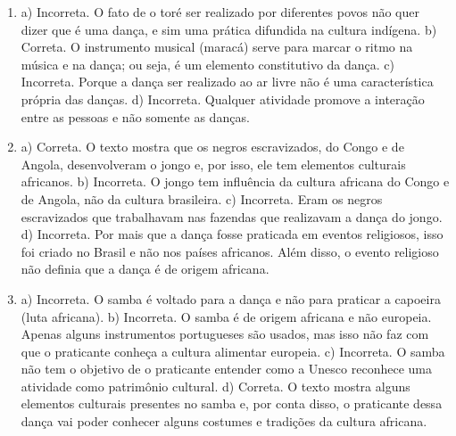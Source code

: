 \begin{enumerate}
\item
a) Incorreta. O fato de o toré ser realizado por diferentes povos não quer
dizer que é uma dança, e sim uma prática difundida na cultura indígena.
b) Correta. O instrumento musical (maracá) serve para marcar o ritmo na música e na dança; ou seja, é um elemento constitutivo da dança.
c) Incorreta. Porque a dança ser realizado ao ar livre não é uma
característica própria das danças.
d) Incorreta. Qualquer atividade promove a interação entre as
pessoas e não somente as danças.

\item
a) Correta. O texto mostra que os negros escravizados, do Congo e
de Angola, desenvolveram o jongo e, por isso, ele tem elementos
culturais africanos.
b) Incorreta. O jongo tem influência da cultura africana do Congo
e de Angola, não da cultura brasileira.
c) Incorreta. Eram os negros escravizados que trabalhavam nas
fazendas que realizavam a dança do jongo.
d) Incorreta. Por mais que a dança fosse praticada em eventos religiosos,
isso foi criado no Brasil e não nos países africanos. Além disso, o
evento religioso não definia que a dança é de origem africana.

\item
a) Incorreta. O samba é voltado para a dança e não para praticar a capoeira (luta africana).
b) Incorreta. O samba é de origem africana e não europeia. Apenas
alguns instrumentos portugueses são usados, mas isso não faz com que o
praticante conheça a cultura alimentar europeia.
c) Incorreta. O samba não tem o objetivo de o praticante entender
como a Unesco reconhece uma atividade como patrimônio cultural.
d) Correta. O texto mostra alguns elementos culturais presentes
no samba e, por conta disso, o praticante dessa dança vai poder conhecer
alguns costumes e tradições da cultura africana.
\end{enumerate}


